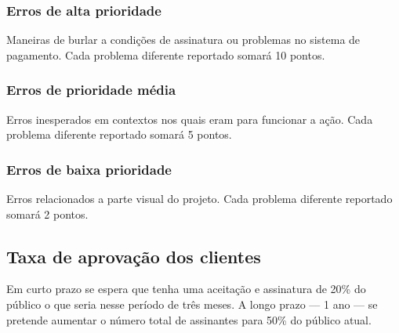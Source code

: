 \subsubsection*{Erros de alta prioridade}
Maneiras de burlar a condições de assinatura ou problemas no sistema de pagamento. Cada problema diferente reportado somará 10 pontos. 

\subsubsection*{Erros de prioridade média}
 Erros inesperados em contextos nos quais eram para funcionar a ação. Cada problema diferente reportado somará 5 pontos. 
 
\subsubsection*{Erros de baixa prioridade}
Erros relacionados a parte visual do projeto. Cada problema diferente reportado somará 2 pontos.

\subsection*{Taxa de aprovação dos clientes}
Em curto prazo se espera que tenha uma aceitação e assinatura de 20\% do público o que seria nesse período de três meses. A longo prazo — 1 ano — se pretende aumentar o número total de assinantes para 50\% do público atual.